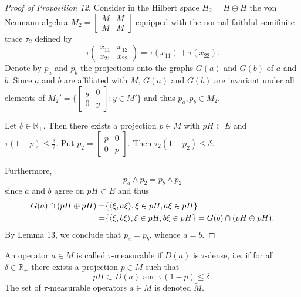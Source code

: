\begin{proof}[Proof of Proposition 12]
    Consider in the Hilbert space $H_2=H\oplus H$ the von Neumann algebra $M_2=\begin{bmatrix}
        M&M\\
        M&M
    \end{bmatrix}$ equipped with the normal faithful semifinite trace $\tau_2$ defined by 
    \[
        \tau \begin{pmatrix}
            x_{11}& x_{12}\\
            x_{21}& x_{22}
        \end{pmatrix}=\tau(x_{11})+\tau(x_{22}).
    \]
    Denote by $p_a$ and $p_b$ the projections onto the graphs $G(a)$ and $G(b)$ of $a$ and $b$. Since $a$ and $b$ are affiliated with $M$, $G(a)$ and $G(b)$ are invariant under all elements of $M_2'=\{\begin{bmatrix}
        y&0\\
        0&y
    \end{bmatrix}:y\in M'\}$ and thus $p_a,p_b\in M_2$. \par 
Let $\delta\in \mathbb{R}_+$. Then there exists a projection $p\in M$ with
$pH\subset E$ and $\tau(1-p)\leq \frac{\delta}{2}$. Put $p_2= \begin{bmatrix}
    p&0\\
    0&p
\end{bmatrix}$. Then $\tau_2(1-p_2)\leq \delta$.\par
Furthermore,
\[
    p_a\wedge p_2=p_b\wedge p_2
\]
since $a$ and $b$ agree on $pH\subset E$ and thus
\[
    \begin{split}
        G(a)\cap(pH\oplus pH) =& \{\langle\xi,a\xi\rangle,\xi\in pH, a\xi\in pH\}\\
                            =& \{\langle\xi,b\xi\rangle,\xi\in pH, b\xi\in pH\}=G(b)\cap(pH\oplus pH).
    \end{split}
\]
By Lemma 13, we conclude that $p_a=p_b$, whence $a = b$. 
\end{proof}
\begin{definition}\label{def: 14}
    An operator $a\in \overline{M}$ is called $\tau$-measurable if $D(a)$ is $\tau$-dense, i.e. if for all $\delta\in \mathbb{R}_+$ there exists a projection $p\in M$ such that
    \begin{equation}
        pH\subset D(a) \text{ and } \tau(1-p)\leq \delta.          
    \end{equation} 
    The set of $\tau$-measurable operators $a\in \overline{M}$ is denoted $\widetilde{M}$.
\end{definition}
